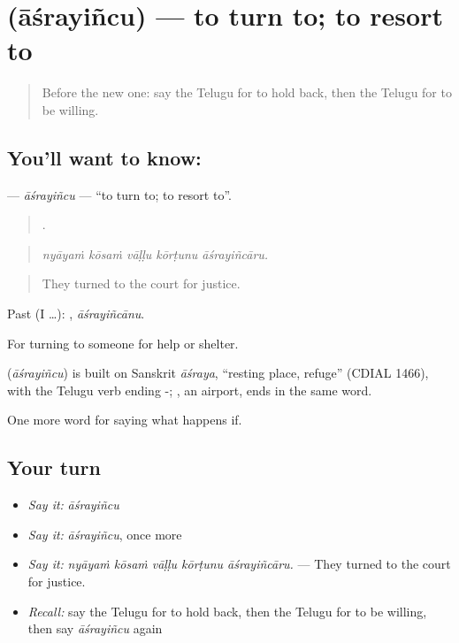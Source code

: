 \section[\texorpdfstring{\te{ఆశ్రయించు} (āśrayiñcu)}{ఆశ్రయించు (āśrayiñcu)}]{ (āśrayiñcu) — to turn to; to resort to}

\label{lesson:TE-C426-asrayincu}



\begin{quote}
Before the new one: say the Telugu for to hold back, then the Telugu for to be willing.
\end{quote}

\subsection*{You'll want to know: }
\textbf{} — \emph{āśrayiñcu} — \textquotedblleft{}to turn to; to resort to\textquotedblright{}.

\begin{quote}
    .
\end{quote}

\begin{quote}
\emph{nyāyaṁ kōsaṁ vāḷḷu kōrṭunu āśrayiñcāru.}
\end{quote}

\begin{quote}
They turned to the court for justice.
\end{quote}

Past (I …): , \emph{āśrayiñcānu}.

For turning to someone for help or shelter.

\begin{cousinweb}
\textbf{} (\emph{āśrayiñcu}) is built on Sanskrit \emph{āśraya}, \textquotedblleft{}resting place, refuge\textquotedblright{} (CDIAL 1466), with the Telugu verb ending -; , an airport, ends in the same word.
\end{cousinweb}

\begin{grammarlens}[title={What you've built}]
One more word for saying what happens if.
\end{grammarlens}

\subsection*{Your turn}
\begin{itemize}
\raggedright
  \item \emph{Say it:} \emph{āśrayiñcu}
  \item \emph{Say it:} \emph{āśrayiñcu}, once more
  \item \emph{Say it:} \emph{nyāyaṁ kōsaṁ vāḷḷu kōrṭunu āśrayiñcāru.} — They turned to the court for justice.
  \item \emph{Recall:} say the Telugu for to hold back, then the Telugu for to be willing, then say \emph{āśrayiñcu} again
\end{itemize}

